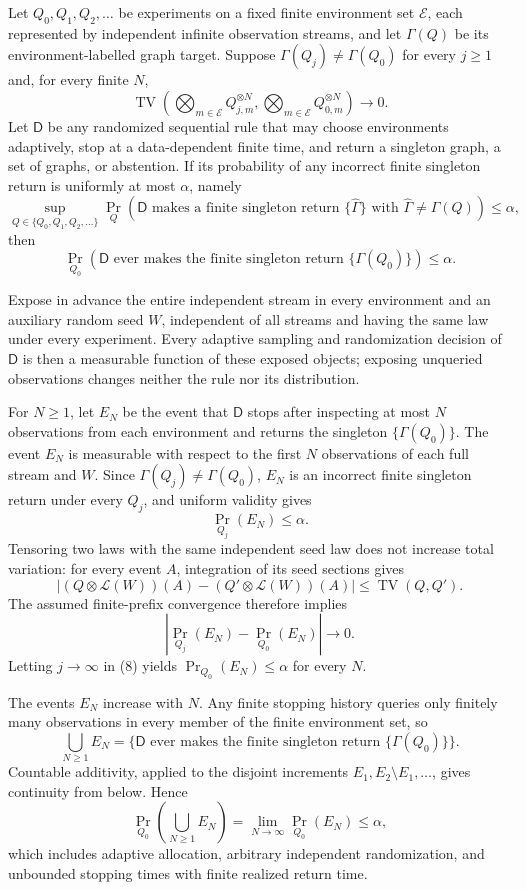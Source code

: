 Let \(Q_0,Q_1,Q_2,\ldots\) be experiments on a fixed finite environment set \(\mathcal E\), each represented by independent infinite observation streams, and let \(\Gamma(Q)\) be its environment-labelled graph target.  Suppose \(\Gamma(Q_j)\ne\Gamma(Q_0)\) for every \(j\ge1\) and, for every finite \(N\),
\[
 \operatorname{TV}\!\left(
   \bigotimes_{m\in\mathcal E}Q_{j,m}^{\otimes N},
   \bigotimes_{m\in\mathcal E}Q_{0,m}^{\otimes N}
 \right)\longrightarrow0.
\]
Let \(\mathsf D\) be any randomized sequential rule that may choose environments adaptively, stop at a data-dependent finite time, and return a singleton graph, a set of graphs, or abstention.  If its probability of any incorrect finite singleton return is uniformly at most \(\alpha\), namely
\[
 \sup_{Q\in\{Q_0,Q_1,Q_2,\ldots\}}
 \Pr_Q\!\left(
   \mathsf D\text{ makes a finite singleton return }\{\widehat\Gamma\}
   \text{ with }\widehat\Gamma\ne\Gamma(Q)
 \right)\le\alpha,
\]
then
\[
 \Pr_{Q_0}\!\left(
   \mathsf D\text{ ever makes the finite singleton return }\{\Gamma(Q_0)\}
 \right)\le\alpha.
\]

Expose in advance the entire independent stream in every environment and an auxiliary random seed \(W\), independent of all streams and having the same law under every experiment.  Every adaptive sampling and randomization decision of \(\mathsf D\) is then a measurable function of these exposed objects; exposing unqueried observations changes neither the rule nor its distribution.

For \(N\ge1\), let \(E_N\) be the event that \(\mathsf D\) stops after inspecting at most \(N\) observations from each environment and returns the singleton \(\{\Gamma(Q_0)\}\).  The event \(E_N\) is measurable with respect to the first \(N\) observations of each full stream and \(W\).  Since \(\Gamma(Q_j)\ne\Gamma(Q_0)\), \(E_N\) is an incorrect finite singleton return under every \(Q_j\), and uniform validity gives
\[
 \Pr_{Q_j}(E_N)\le\alpha.
 \tag{8}
\]
Tensoring two laws with the same independent seed law does not increase total variation: for every event \(A\), integration of its seed sections gives
\[
 |(Q\otimes\mathcal L(W))(A)-(Q'\otimes\mathcal L(W))(A)|
 \le\operatorname{TV}(Q,Q').
\]
The assumed finite-prefix convergence therefore implies
\[
 |\Pr_{Q_j}(E_N)-\Pr_{Q_0}(E_N)|\longrightarrow0.
\]
Letting \(j\to\infty\) in (8) yields \(\Pr_{Q_0}(E_N)\le\alpha\) for every \(N\).

The events \(E_N\) increase with \(N\).  Any finite stopping history queries only finitely many observations in every member of the finite environment set, so
\[
 \bigcup_{N\ge1}E_N
 =\{\mathsf D\text{ ever makes the finite singleton return }\{\Gamma(Q_0)\}\}.
\]
Countable additivity, applied to the disjoint increments \(E_1,E_2\setminus E_1,\ldots\), gives continuity from below.  Hence
\[
 \Pr_{Q_0}\!\left(\bigcup_{N\ge1}E_N\right)
 =\lim_{N\to\infty}\Pr_{Q_0}(E_N)\le\alpha,
\]
which includes adaptive allocation, arbitrary independent randomization, and unbounded stopping times with finite realized return time.

